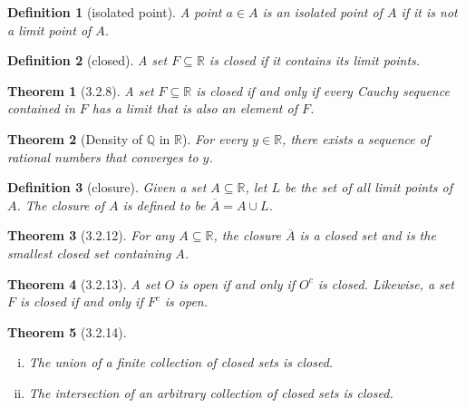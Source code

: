 \documentclass{article}
\newtheorem{definition}{Definition}
\newtheorem{theorem}{Theorem}
\begin{document}
\begin{definition}[isolated point]
    A point $a \in A$ is an \textit{isolated point} of $A$ if it is not a limit point of $A$.
\end{definition}

\begin{definition}[closed]
    A set $F \subseteq \mathbb{R}$ is \textit{closed} if it contains its limit points.
\end{definition}

\begin{theorem}[3.2.8]
    A set $F \subseteq \mathbb{R}$ is closed if and only if every Cauchy sequence contained in $F$ has a limit that is also an element of $F$.
\end{theorem}

\begin{theorem}[Density of $\mathbb{Q}$ in $\mathbb{R}$]
    For every $y \in \mathbb{R}$, there exists a sequence of rational numbers that converges to $y$.
\end{theorem}

\begin{definition}[closure]
    Given a set $A \subseteq \mathbb{R}$, let $L$ be the set of all limit points of $A$. The \textit{closure} of $A$ is defined to be $\overline{A}=A \cup L$.
\end{definition}


\begin{theorem}[3.2.12]
    For any $A \subseteq \mathbb{R}$, the closure $\overline{A}$ is a closed set and is the smallest closed set containing $A$.
\end{theorem}

\begin{theorem}[3.2.13]
    A set $O$ is open if and only if $O^c$ is closed. Likewise, a set $F$ is closed if and only if $F^c$ is open.
\end{theorem}

\begin{theorem}[3.2.14]
    \begin{enumerate}[(i)]
        \item The union of a finite collection of closed sets is closed.
        \item The intersection of an arbitrary collection of closed sets is closed.
    \end{enumerate}
\end{theorem}
\end{document}
